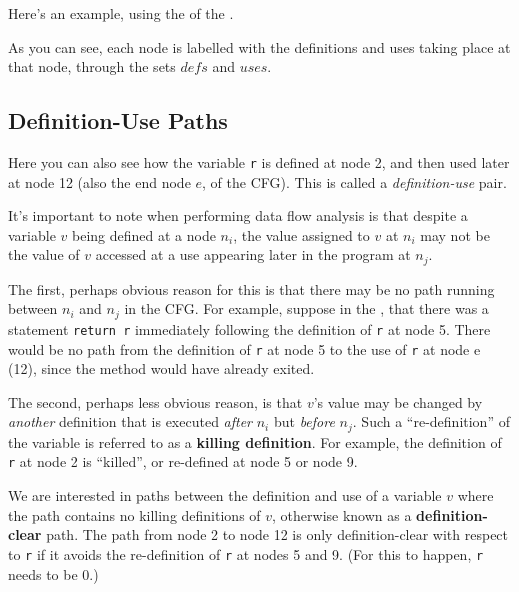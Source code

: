 Here's an example, using the \signmethod of the \signutilsclass.

As you can see, each node is labelled with the definitions and uses taking place
at that node, through the sets $\mathit{defs}$ and $\mathit{uses}$.


\subsection{Definition-Use Paths}


Here you can also see how the variable {\tt r} is defined at node 2, and then used
later at node 12 (also the end node $e$, of the CFG). This is called a {\it
definition-use} pair.


It's important to note when performing data flow analysis is that despite a
variable $v$ being defined at a node $n_i$, the value assigned to $v$ at $n_i$
may not be the value of $v$ accessed at a use appearing later in the program at
$n_j$.

The first, perhaps obvious reason for this is that there may be no path running
between $n_i$ and $n_j$ in the CFG. For example, suppose in the \signmethod,
that there was a statement {\tt return r} immediately following the definition
of {\tt r} at node 5. There would be no path from the definition of {\tt r} at
node 5 to the use of {\tt r} at node e (12), since the method would have already
exited.


The second, perhaps less obvious reason, is that $v$'s value may be changed by
{\it another} definition that is executed {\it after} $n_i$ but {\it before}
$n_j$. Such a ``re-definition'' of the variable is referred to as a {\bf killing
definition}. For example, the definition of {\tt r} at node 2 is ``killed'', or
re-defined at node 5 or node 9. 


We are interested in paths between the definition and use of a variable $v$
where the path contains no killing definitions of $v$, otherwise known as a {\bf
definition-clear} path. The path from node 2 to node 12 is only definition-clear
with respect to {\tt r} if it avoids the re-definition of {\tt r} at nodes 5 and
9. (For this to happen, {\tt r} needs to be 0.)

